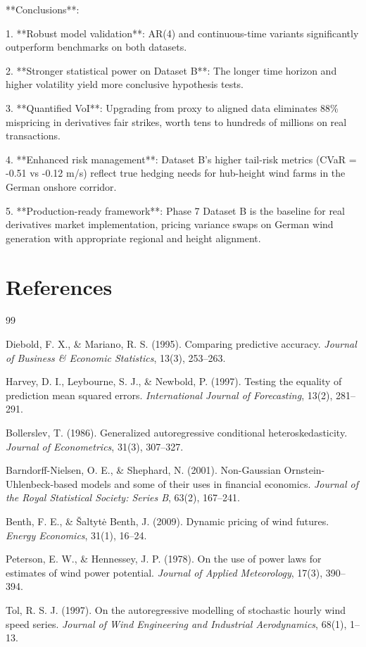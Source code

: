 \documentclass[11pt, a4paper, twoside]{article}
\begin{document}
**Conclusions**:

1. **Robust model validation**: AR(4) and continuous-time variants significantly outperform benchmarks on both datasets.

2. **Stronger statistical power on Dataset B**: The longer time horizon and higher volatility yield more conclusive hypothesis tests.

3. **Quantified VoI**: Upgrading from proxy to aligned data eliminates 88\% mispricing in derivatives fair strikes, worth tens to hundreds of millions on real transactions.

4. **Enhanced risk management**: Dataset B's higher tail-risk metrics (CVaR = -0.51 vs -0.12 m/s) reflect true hedging needs for hub-height wind farms in the German onshore corridor.

5. **Production-ready framework**: Phase 7 Dataset B is the baseline for real derivatives market implementation, pricing variance swaps on German wind generation with appropriate regional and height alignment.

\section*{References}

\begin{thebibliography}{99}

Diebold, F. X., \& Mariano, R. S. (1995). Comparing predictive accuracy. \textit{Journal of Business \& Economic Statistics}, 13(3), 253--263.

Harvey, D. I., Leybourne, S. J., \& Newbold, P. (1997). Testing the equality of prediction mean squared errors. \textit{International Journal of Forecasting}, 13(2), 281--291.

Bollerslev, T. (1986). Generalized autoregressive conditional heteroskedasticity. \textit{Journal of Econometrics}, 31(3), 307--327.

Barndorff-Nielsen, O. E., \& Shephard, N. (2001). Non-Gaussian Ornstein-Uhlenbeck-based models and some of their uses in financial economics. \textit{Journal of the Royal Statistical Society: Series B}, 63(2), 167--241.

Benth, F. E., \& Šaltytė Benth, J. (2009). Dynamic pricing of wind futures. \textit{Energy Economics}, 31(1), 16--24.

Peterson, E. W., \& Hennessey, J. P. (1978). On the use of power laws for estimates of wind power potential. \textit{Journal of Applied Meteorology}, 17(3), 390--394.

Tol, R. S. J. (1997). On the autoregressive modelling of stochastic hourly wind speed series. \textit{Journal of Wind Engineering and Industrial Aerodynamics}, 68(1), 1--13.

\end{thebibliography}
\end{document}

